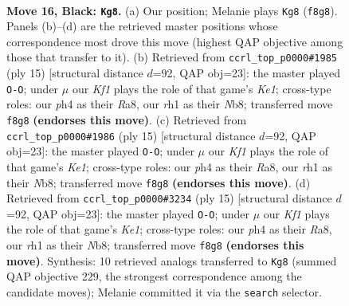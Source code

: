 \documentclass[11pt]{article}
\begin{document}
\clearpage

\begin{figure}[p]\centering
\begin{subfigure}{0.46\textwidth}\centering
\resizebox{\linewidth}{!}{%
\newchessgame
\chessboard[
  setfen={rnbq1k2/p4pp1/1pr2n2/3p2Np/P2P3P/RPNB2P1/3K1P2/3Q3R b - - 0 16},
  showmover=false,
  pgfstyle=straightmove, color=movearrow, markmove={f8-g8}
]}
\caption{}
\end{subfigure}\hfill
\begin{subfigure}{0.46\textwidth}\centering
\resizebox{\linewidth}{!}{%
\newchessgame
\chessboard[
  setfen={rnb1k2r/1pp2ppp/p2q1n2/3p4/3P4/2NBP3/PP3PPP/R2QK1NR b KQkq - 1 8},
  showmover=false,
  pgfstyle=straightmove, color=movearrow, markmove={e8-g8}
]}
\caption{}
\end{subfigure}
\\[4pt]
\begin{subfigure}{0.46\textwidth}\centering
\resizebox{\linewidth}{!}{%
\newchessgame
\chessboard[
  setfen={rnb1k2r/1pp2ppp/p2q1n2/3p4/3P4/2NBP3/PP3PPP/R2QK1NR b KQkq - 1 8},
  showmover=false,
  pgfstyle=straightmove, color=movearrow, markmove={e8-g8}
]}
\caption{}
\end{subfigure}\hfill
\begin{subfigure}{0.46\textwidth}\centering
\resizebox{\linewidth}{!}{%
\newchessgame
\chessboard[
  setfen={rnb1k2r/1pp2ppp/p2q1n2/3p4/3P4/2NBP3/PP3PPP/R2QK1NR b KQkq - 1 8},
  showmover=false,
  pgfstyle=straightmove, color=movearrow, markmove={e8-g8}
]}
\caption{}
\end{subfigure}
\caption{\textbf{Move 16, Black: \texttt{Kg8}.} (a) Our position; Melanie plays \texttt{Kg8} (\texttt{f8g8}). Panels (b)--(d) are the retrieved master positions whose correspondence most drove this move (highest QAP objective among those that transfer to it). (b) Retrieved from \texttt{ccrl\_top\_p0000\#1985} (ply 15) [structural distance $d$=92, QAP obj=23]: the master played \texttt{O-O}; under $\mu$ our \emph{Kf1} plays the role of that game's \emph{Ke1}; cross-type roles: our \emph{p}h4 as their \emph{R}a8, our \emph{r}h1 as their \emph{N}b8; transferred move \texttt{f8g8} \textbf{(endorses this move)}. (c) Retrieved from \texttt{ccrl\_top\_p0000\#1986} (ply 15) [structural distance $d$=92, QAP obj=23]: the master played \texttt{O-O}; under $\mu$ our \emph{Kf1} plays the role of that game's \emph{Ke1}; cross-type roles: our \emph{p}h4 as their \emph{R}a8, our \emph{r}h1 as their \emph{N}b8; transferred move \texttt{f8g8} \textbf{(endorses this move)}. (d) Retrieved from \texttt{ccrl\_top\_p0000\#3234} (ply 15) [structural distance $d$=92, QAP obj=23]: the master played \texttt{O-O}; under $\mu$ our \emph{Kf1} plays the role of that game's \emph{Ke1}; cross-type roles: our \emph{p}h4 as their \emph{R}a8, our \emph{r}h1 as their \emph{N}b8; transferred move \texttt{f8g8} \textbf{(endorses this move)}. Synthesis: 10 retrieved analogs transferred to \texttt{Kg8} (summed QAP objective 229, the strongest correspondence among the candidate moves); Melanie committed it via the \texttt{search} selector.}
\label{fig:thought-m31}
\end{figure}
\end{document}
